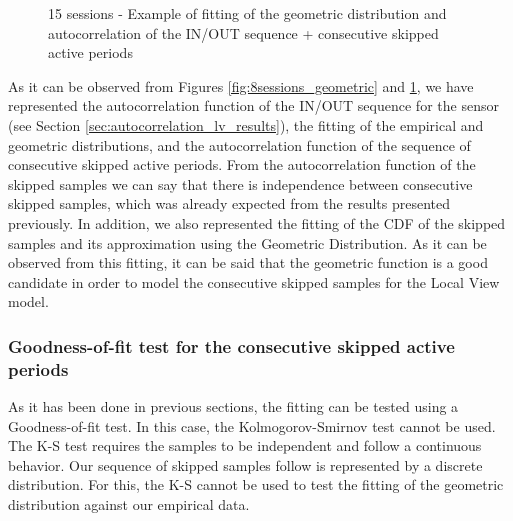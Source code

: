 \begin{figure}[h!]
	\centering
	\caption{15 sessions - Example of fitting of the geometric distribution and autocorrelation of the IN/OUT sequence + consecutive skipped active periods}
	\label{fig:15sessions_geometric}
\end{figure}

As it can be observed from Figures \ref{fig:8sessions_geometric} and \ref{fig:15sessions_geometric}, we have represented the autocorrelation function of the IN/OUT sequence for the sensor (see Section \ref{sec:autocorrelation_lv_results}), the fitting of the empirical and geometric distributions, and the autocorrelation function of the sequence of consecutive skipped active periods. From the autocorrelation function of the skipped samples we can say that there is independence between consecutive skipped samples, which was already expected from the results presented previously. In addition, we also represented the fitting of the CDF of the skipped samples and its approximation using the Geometric Distribution. As it can be observed from this fitting, it can be said that the geometric function is a good candidate in order to model the consecutive skipped samples for the Local View model.

\subsubsection{Goodness-of-fit test for the consecutive skipped active periods} \label{sec:gof_lv_skipped}
As it has been done in previous sections, the fitting can be tested using a Goodness-of-fit test. In this case, the Kolmogorov-Smirnov test cannot be used. The \acs{K-S} test requires the samples to be independent and follow a continuous behavior. Our sequence of skipped samples follow is represented by a discrete distribution. For this, the \acs{K-S} cannot be used to test the fitting of the geometric distribution against our empirical data.

